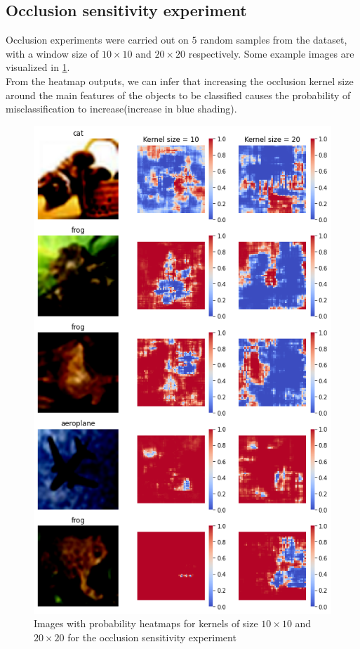 \documentclass{article}
\begin{document}
\subsection{Occlusion sensitivity experiment}
Occlusion experiments were carried out on $5$ random samples from the dataset, with a window size of $10 \times 10$ and $20 \times 20$ respectively. Some example images are visualized in \cref{fig:occhmps}.\\
From the heatmap outputs, we can infer that increasing the occlusion kernel size around the main features of the objects to be classified causes the probability of misclassification to increase(increase in blue shading).
\begin{figure}[t]
	\centering
	\includegraphics[scale=0.4]{../code/images/Occlusion_heatmaps.png}
	\caption{Images with probability heatmaps for kernels of size $10 \times 10$ and $20 \times 20$ for the occlusion sensitivity experiment}
	\label{fig:occhmps}
\end{figure}
\end{document}

